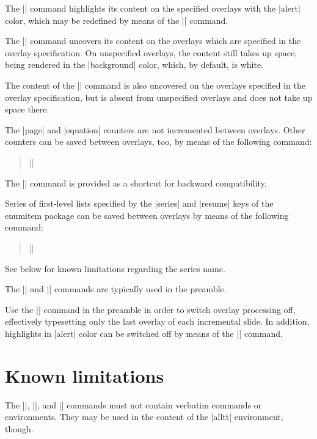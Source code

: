 \documentclass[a4paper]{ltxdoc}
\begin{document}
The |\alert| command highlights its content on the specified overlays with the
|alert| color, which may be redefined by means of the |\definecolor| command.

The |\visible| command uncovers its content on the overlays which are specified
in the overlay specification. On unspecified overlays, the content still takes
up space, being rendered in the |background| color, which, by default, is white.

The content of the |\only| command is also uncovered on the overlays specified
in the overlay specification, but is absent from unspecified overlays and does
not take up space there.

\pagebreak
\DescribeMacro{\savecountersbetweenoverlays}
The |page| and |equation| counters are not incremented between overlays. Other
counters can be saved between overlays, too, by means of the following command:
\begin{quote}
||
\end{quote}
\DescribeMacro{\savebetweenoverlays}
The |\savebetweenoverlays| command is provided as a shortcut for backward
compatibility.

\DescribeMacro{\saveseriesbetweenoverlays}
Series of first-level lists specified by the |series| and |resume| keys of the
\textsf{enumitem} package can be saved between overlays by means of the
following command:
\begin{quote}
||
\end{quote}
See below for known limitations regarding the series name.

The |\savecountersbetweenoverlays| and |\saveseriesbetweenoverlays| commands
are typically used in the preamble.

\DescribeMacro{\overlaysoff}
\DescribeMacro{\alertsoff}
Use the |\overlaysoff| command in the preamble in order to switch overlay
processing off, effectively typesetting only the last overlay of each
incremental slide. In addition, highlights in |alert| color can be switched off
by means of the |\alertsoff| command.

\section{Known limitations}

The |\alert|, |\visible|, and |\only| commands must not contain verbatim
commands or environments. They may be used in the content of the |alltt|
environment, though.
\end{document}
